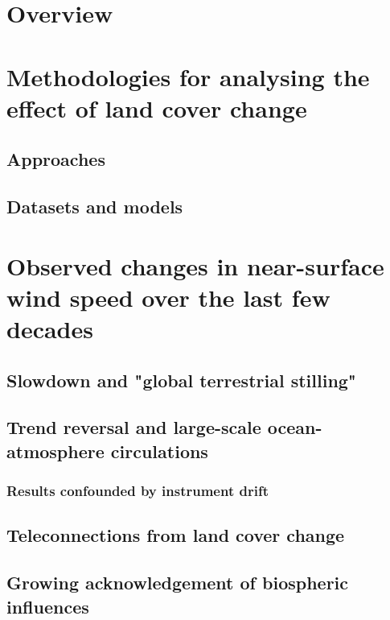 \section{Overview}

\section[Methods for analysing land cover change]{Methodologies for analysing the effect of land cover change}

\subsection{Approaches}

\subsection{Datasets and models}

\section[Recent trends in near-surface wind speed]{Observed changes in near-surface wind speed over the last few decades}

\subsection{Slowdown and "global terrestrial stilling"}

\subsection[Trend reversal and LOACs]{Trend reversal and large-scale ocean-atmosphere circulations}

\subsubsection{Results confounded by instrument drift}

\subsection{Teleconnections from land cover change}

\subsection{Growing acknowledgement of biospheric influences}

